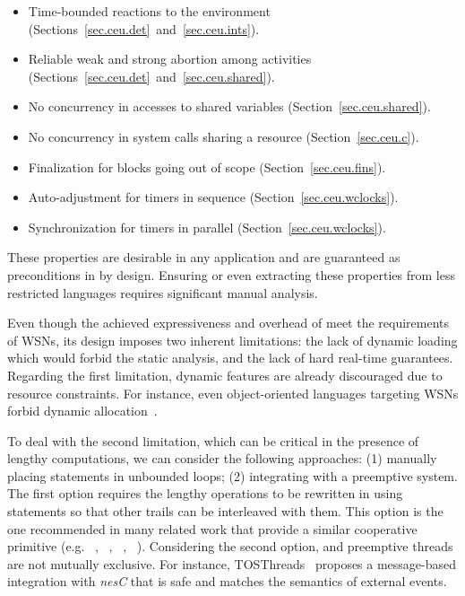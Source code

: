 \begin{itemize}
\item Time-bounded reactions to the environment
        (Sections~\ref{sec.ceu.det}~and~\ref{sec.ceu.ints}).
\item Reliable weak and strong abortion among activities
        (Sections~\ref{sec.ceu.det}~and~\ref{sec.ceu.shared}).
\item No concurrency in accesses to shared variables
(Section~\ref{sec.ceu.shared}).
\item No concurrency in system calls sharing a resource
        (Section~\ref{sec.ceu.c}).
\item Finalization for blocks going out of scope
        (Section~\ref{sec.ceu.fins}).
\item Auto-adjustment for timers in sequence
        (Section~\ref{sec.ceu.wclocks}).
\item Synchronization for timers in parallel
        (Section~\ref{sec.ceu.wclocks}).
\end{itemize}

These properties are desirable in any application and are guaranteed as 
preconditions in \CEU by design.
Ensuring or even extracting these properties from less restricted languages 
requires significant manual analysis.

Even though the achieved expressiveness and overhead of \CEU meet the 
requirements of WSNs, its design imposes two inherent limitations:
the lack of dynamic loading which would forbid the static analysis,
and the lack of hard real-time guarantees.
%
Regarding the first limitation, dynamic features are already discouraged due to 
resource constraints.
For instance, even object-oriented languages targeting WSNs forbid dynamic 
allocation~\cite{wsn.flowtalk,wsn.virgil}.

To deal with the second limitation, which can be critical in the presence of 
lengthy computations, we can consider the following approaches:
(1) manually placing  statements in unbounded loops;
(2) integrating \CEU with a preemptive system.
%
The first option requires the lengthy operations to be rewritten in \CEU using
 statements so that other trails can be interleaved with them.
This option is the one recommended in many related work that provide a similar 
cooperative primitive (e.g. ~\cite{esterel.primer}, 
~\cite{wsn.protothreads}, ~\cite{wsn.sol}, 
~\cite{wsn.nesc}).
%
Considering the second option, \CEU and preemptive threads are not mutually 
exclusive.
For instance, TOSThreads~\cite{wsn.tosthreads} proposes a message-based 
integration with \emph{nesC} that is safe and matches the semantics of \CEU 
external events.

